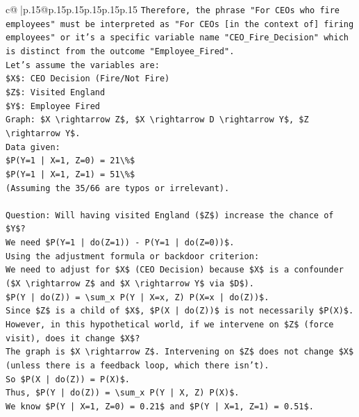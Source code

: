 \documentclass{article}
\begin{document}
{\begin{supertabular}{c@{$\;$}|p{.15\linewidth}@{}p{.15\linewidth}p{.15\linewidth}p{.15\linewidth}p{.15\linewidth}p{.15\linewidth}}
{{{\texttt{Therefore, the phrase "For CEOs who fire employees" must be interpreted as "For CEOs {[}in the context of{]} firing employees" or it's a specific variable name "CEO\_Fire\_Decision" which is distinct from the outcome "Employee\_Fired".} \\
\texttt{Let's assume the variables are:} \\
\texttt{\$X\$: CEO Decision (Fire/Not Fire)} \\
\texttt{\$Z\$: Visited England} \\
\texttt{\$Y\$: Employee Fired} \\
\texttt{Graph: \$X \textbackslash{}rightarrow Z\$, \$X \textbackslash{}rightarrow D \textbackslash{}rightarrow Y\$, \$Z \textbackslash{}rightarrow Y\$.} \\
\texttt{Data given:} \\
\texttt{\$P(Y=1 | X=1, Z=0) = 21\textbackslash{}\%\$} \\
\texttt{\$P(Y=1 | X=1, Z=1) = 51\textbackslash{}\%\$} \\
\texttt{(Assuming the 35/66 are typos or irrelevant).} \\
\\ 
\texttt{Question: Will having visited England (\$Z\$) increase the chance of \$Y\$?} \\
\texttt{We need \$P(Y=1 | do(Z=1)) {-} P(Y=1 | do(Z=0))\$.} \\
\texttt{Using the adjustment formula or backdoor criterion:} \\
\texttt{We need to adjust for \$X\$ (CEO Decision) because \$X\$ is a confounder (\$X \textbackslash{}rightarrow Z\$ and \$X \textbackslash{}rightarrow Y\$ via \$D\$).} \\
\texttt{\$P(Y | do(Z)) = \textbackslash{}sum\_x P(Y | X=x, Z) P(X=x | do(Z))\$.} \\
\texttt{Since \$Z\$ is a child of \$X\$, \$P(X | do(Z))\$ is not necessarily \$P(X)\$.} \\
\texttt{However, in this hypothetical world, if we intervene on \$Z\$ (force visit), does it change \$X\$?} \\
\texttt{The graph is \$X \textbackslash{}rightarrow Z\$. Intervening on \$Z\$ does not change \$X\$ (unless there is a feedback loop, which there isn't).} \\
\texttt{So \$P(X | do(Z)) = P(X)\$.} \\
\texttt{Thus, \$P(Y | do(Z)) = \textbackslash{}sum\_x P(Y | X, Z) P(X)\$.} \\
\texttt{We know \$P(Y | X=1, Z=0) = 0.21\$ and \$P(Y | X=1, Z=1) = 0.51\$.} \\
}}}
\end{supertabular}}
\end{document}
